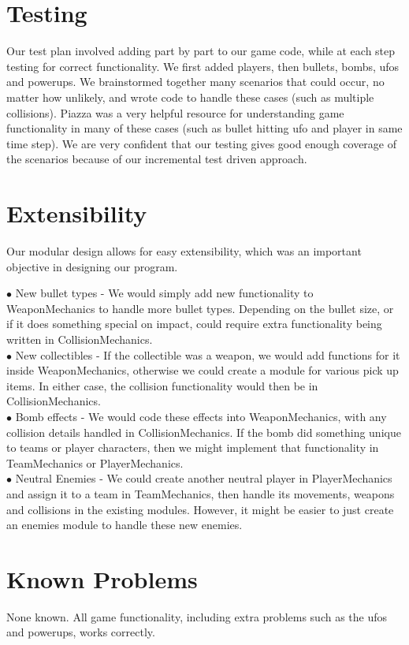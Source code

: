 \documentclass{article}
\begin{document}
\section{Testing}
Our test plan involved adding part by part to our game code, while at each step testing for correct functionality. We first added players, then bullets, bombs, ufos and powerups. We brainstormed together many scenarios that could occur, no matter how unlikely, and wrote code to handle these cases (such as multiple collisions). Piazza was a very helpful resource for understanding game functionality in many of these cases (such as bullet hitting ufo and player in same time step). We are very confident that our testing gives good enough coverage of the scenarios because of our incremental test driven approach.

\section{Extensibility}

Our modular design allows for easy extensibility, which was an important objective in designing our program.

$\bullet$ New bullet types - We would simply add new functionality to WeaponMechanics to handle more bullet types. Depending on the bullet size, or if it does something special on impact, could require extra functionality being written in CollisionMechanics. \\
$\bullet$ New collectibles - If the collectible was a weapon, we would add functions for it inside WeaponMechanics, otherwise we could
create a module for various pick up items. In either case, the collision functionality would then be in CollisionMechanics. \\
$\bullet$ Bomb effects - We would code these effects into WeaponMechanics, with any collision details handled in CollisionMechanics. If the bomb did 
something unique to teams or player characters, then we might implement that functionality in TeamMechanics or PlayerMechanics. \\
$\bullet$ Neutral Enemies - We could create another neutral player in PlayerMechanics and assign it to a  team in TeamMechanics, then handle its
movements, weapons and collisions in the existing modules. However, it might be easier to just create an enemies module to handle these new enemies.

\section {Known Problems}
None known. All game functionality, including extra problems such as the ufos and powerups, works correctly.
\end{document}
